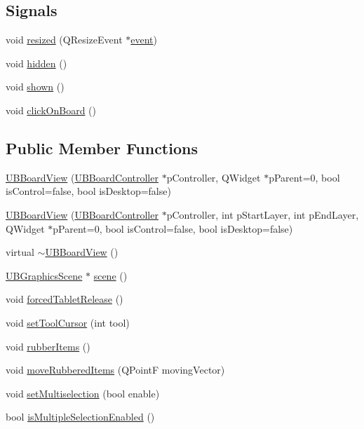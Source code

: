 \subsection*{Signals}
\begin{DoxyCompactItemize}
\item 
void \hyperlink{class_u_b_board_view_a169a2815ea03ff65e02ba68202b6748d}{resized} (Q\-Resize\-Event $\ast$\hyperlink{class_u_b_board_view_a9052cd8486cf023aaff430a859f2f4af}{event})
\item 
void \hyperlink{class_u_b_board_view_a89b87a105417f12c13bde309188c57d1}{hidden} ()
\item 
void \hyperlink{class_u_b_board_view_a07e6f339699cd4eba80a485c7e8e5b21}{shown} ()
\item 
void \hyperlink{class_u_b_board_view_aafb5973b4a8212dc1e16ca11019ad931}{click\-On\-Board} ()
\end{DoxyCompactItemize}
\subsection*{Public Member Functions}
\begin{DoxyCompactItemize}
\item 
\hyperlink{class_u_b_board_view_acd0ed87356ff26df8cbf3e9c62e495c2}{U\-B\-Board\-View} (\hyperlink{class_u_b_board_controller}{U\-B\-Board\-Controller} $\ast$p\-Controller, Q\-Widget $\ast$p\-Parent=0, bool is\-Control=false, bool is\-Desktop=false)
\item 
\hyperlink{class_u_b_board_view_a19c086b6973f9998e50f737204a4460a}{U\-B\-Board\-View} (\hyperlink{class_u_b_board_controller}{U\-B\-Board\-Controller} $\ast$p\-Controller, int p\-Start\-Layer, int p\-End\-Layer, Q\-Widget $\ast$p\-Parent=0, bool is\-Control=false, bool is\-Desktop=false)
\item 
virtual \hyperlink{class_u_b_board_view_acecd182e9c8cea49b5ab9b6bbf64f87f}{$\sim$\-U\-B\-Board\-View} ()
\item 
\hyperlink{class_u_b_graphics_scene}{U\-B\-Graphics\-Scene} $\ast$ \hyperlink{class_u_b_board_view_a471b5373f2debb2c5cb6e2d0db6b74f1}{scene} ()
\item 
void \hyperlink{class_u_b_board_view_a67410b1a3e2af79f17fa37999c96e534}{forced\-Tablet\-Release} ()
\item 
void \hyperlink{class_u_b_board_view_a2c6d79af6b95057a648ca9235dea89ac}{set\-Tool\-Cursor} (int tool)
\item 
void \hyperlink{class_u_b_board_view_a8f77b8aadcbfb88f92362906960bea89}{rubber\-Items} ()
\item 
void \hyperlink{class_u_b_board_view_a712b3d478ccea75d1adf746ad44ea64b}{move\-Rubbered\-Items} (Q\-Point\-F moving\-Vector)
\item 
void \hyperlink{class_u_b_board_view_abb4c24e88d8f141448c0fc69849d97b9}{set\-Multiselection} (bool enable)
\item 
bool \hyperlink{class_u_b_board_view_ab75675b9d680aa0990d99bf75a2a98b5}{is\-Multiple\-Selection\-Enabled} ()
\end{DoxyCompactItemize}

